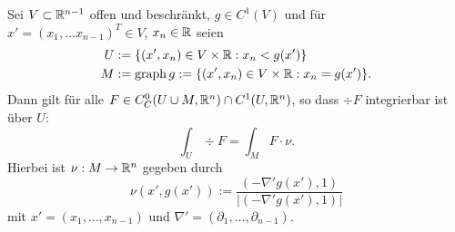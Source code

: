 \clearpage

\begin{thm}
 Sei $V \subset \mathbb{R}^{n-1}$ offen und beschränkt, $g \in C^1(V)$ und für $x' = (x_1, \ldots x_{n-1})^T \in V$, $x_n \in \mathbb{R}$ seien
 \[ \begin{aligned}
     U &:= \{ (x',x_n) \in V \times \mathbb{R} : x_n < g(x') \} \\
     M &:= \operatorname{graph} g := \{ (x', x_n) \in V \times \mathbb{R} : x_n = g(x') \}.
    \end{aligned} \]
 Dann gilt für alle $F \in C^0_C(U \cup M, \mathbb{R}^n) \cap C^1(U,\mathbb{R}^n)$, so dass $\div F$ integrierbar ist über $U$:
 \[ \int_U \div F = \int_M F \cdot \nu. \]
 Hierbei ist $\nu: M \to \mathbb{R}^n$ gegeben durch
 \[ \nu(x', g(x')) := \frac{ (- \nabla' g(x'), 1) }{ | (- \nabla' g(x'), 1) | } \]
 mit $x'= (x_1, \ldots, x_{n-1})$ und $\nabla' = (\partial_1, \ldots, \partial_{n-1})$.
\end{thm}

